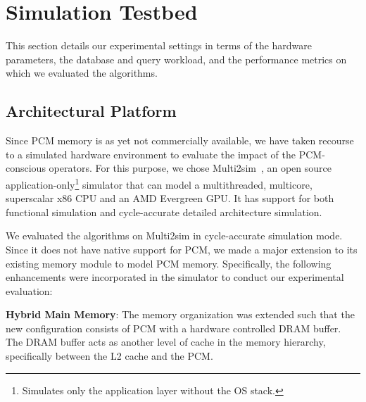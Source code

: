 \begin{comment}
\begin{figure*}[ht]
\sbox{\measurebox}{
\begin{minipage}[b]{.33\textwidth}
\subfloat[Q13]{\usebox{\firstlisting}}
\hfill%
\subfloat[Q16]{\usebox{\secondlisting}}  
\end{minipage}
}
\usebox{\measurebox}\qquad
\hspace{4em}
\begin{minipage}[b][\ht\measurebox][s]{.33\textwidth}
\subfloat[Q19]{\usebox{\thirdlisting}} 
\end{minipage}
\caption{ Queries}
\label{fig:queries}
\end{figure*}


\end{comment}

\section{Simulation Testbed}
This section details our experimental settings in terms of the hardware
parameters, the database and query workload, and the performance metrics
on which we evaluated the algorithms.

\label{sec:exp}


\subsection{Architectural Platform}
Since PCM memory is as yet not commercially available, we
have taken recourse to a simulated hardware environment to
evaluate the impact of the PCM-conscious operators.  For this
purpose, we chose Multi2sim~\cite{multi2sim}, an open source
application-only\footnote{Simulates only the application layer without
the OS stack.} simulator that can model a multithreaded, multicore,
superscalar x86 CPU and an AMD Evergreen GPU. It has support for both
functional simulation and cycle-accurate detailed architecture simulation.

We evaluated the algorithms on Multi2sim in cycle-accurate simulation
mode. Since it does not have native support for PCM, we made a major
extension to its existing memory module to model PCM memory. Specifically,
the following enhancements were incorporated in the simulator to conduct
our experimental evaluation:

\textbf{Hybrid Main Memory}: 
The memory organization was extended such that the new configuration
consists of PCM with a hardware controlled DRAM buffer. The DRAM buffer
acts as another level of cache in the memory hierarchy, specifically
between the L2 cache and the PCM.

